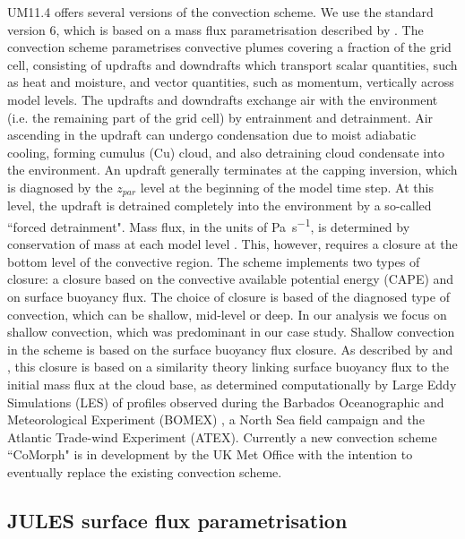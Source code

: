 UM11.4 offers several versions of the convection scheme. We use the standard
version 6, which is based on a mass flux parametrisation described by \cite{gregory1990}.
The convection scheme parametrises convective plumes covering a fraction of the grid cell,
consisting of updrafts and downdrafts which transport scalar quantities,
such as heat and moisture, and vector quantities, such as momentum, vertically
across model levels. The updrafts and downdrafts exchange air with the
environment (i.e. the remaining part of the grid cell) by entrainment and
detrainment. Air ascending in the updraft can undergo condensation due to
moist adiabatic cooling, forming cumulus (Cu) cloud, and also detraining cloud
condensate into the environment. An updraft generally terminates at the capping
inversion, which is diagnosed by the $z_{par}$ level at the beginning of the
model time step. At this level, the updraft
is detrained completely into the environment by a so-called ``forced detrainment".
Mass flux, in the units of \unit{Pa s^{-1}}, is determined by
conservation of mass at each model level \citep{gregory1990}. This, however,
requires a closure at the bottom level of the convective region. The scheme implements
two types of closure: a closure based on the
convective available potential energy (CAPE) and on surface buoyancy flux.
The choice of closure is based of the diagnosed type of convection, which can be
shallow, mid-level or deep. In our analysis we focus on shallow convection,
which was predominant in our case study. Shallow convection in the scheme is based on the
surface buoyancy flux closure. As described by \cite{grant1999} and \cite{grant2001},
this closure is based on a similarity
theory linking surface buoyancy flux to the initial mass flux at the cloud
base, as determined computationally by Large Eddy Simulations (LES) of profiles
observed during the Barbados Oceanographic and Meteorological Experiment (BOMEX)
\citep{davidson1968}, a North Sea field campaign \citep{smith1995} and the Atlantic Trade-wind
Experiment (ATEX). Currently a new convection scheme ``CoMorph" is in development by the UK Met Office
with the intention to eventually replace the existing convection scheme.

\subsection{JULES surface flux parametrisation}
\label{sec:jules}

